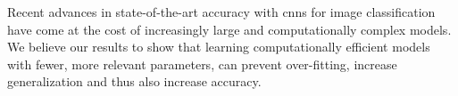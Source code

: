 \documentclass[thesis]{subfiles}
\begin{document}
    Recent advances in state-of-the-art accuracy with \glspl{cnn} for image classification have come at the cost of increasingly large and computationally complex models. We believe our results to show that learning computationally efficient models with fewer, more relevant parameters, can prevent over-fitting, increase generalization and thus also increase accuracy.
\end{document}
